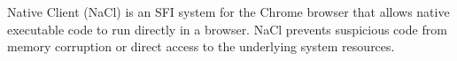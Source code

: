 %
Native Client (NaCl) \cite{NaCl-09} is an SFI system for the
Chrome browser that allows native executable code to run directly in a
browser. NaCl prevents suspicious code
from memory corruption or direct access to the underlying system
resources. 

%
